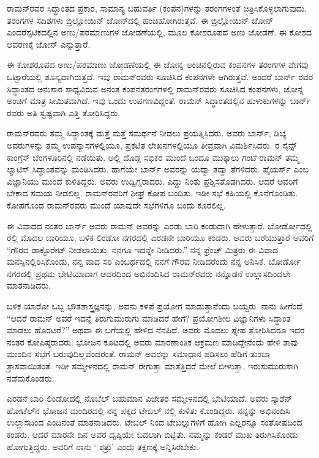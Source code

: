 ರಾಮನ್‍ರವರ ಸಿದ್ಧಾಂತದ ಪ್ರಕಾರ, ಸಾಮಾನ್ಯ ಬಹುವರ್ತಿ (ಕಂಪನ)ಗಳನ್ನು ತರಂಗ\-ಗಳಂತೆ ಚಿತ್ರಿಸಿಕೊಳ್ಳಲಾಗುವುದು. ತರಂಗಗಳ ಸದಿಶಗಳು ಬ್ರಿಲ್ಲೋಯಿನ್ ಜೋನ್‍ದಲ್ಲಿ ಹಂಚಿಹೋಗಿರುತ್ತವೆ. ಈ ಬ್ರಿಲ್ಲೋಯಿನ್ ಜೋನ್ ಎಂದರೆ\enginline{-}ಸ್ಫಟಿಕದಲ್ಲಿನ ಅಣು/ಪರಮಾಣುಗಳ ಜೋಡಣೆಯಲ್ಲಿ, ಮೂಲ ಕೋಶರೂಪದ ಅಣು ಜೋಡಣೆ. ಈ ಕೋಶದ ಆವರಣಕ್ಕೆ ಜೋನ್ ಎನ್ನುತ್ತಾರೆ.

ಈ ಕೋಶರೂಪದ ಅಣು/ಪರಮಾಣು ಜೋಡಣೆಯಲ್ಲಿ ಈ ಜೋನ್ನ ಅಂಚಿನಲ್ಲಿರುವ ಕಂಪನಗಳ ತರಂಗಗಳ ವೇಗವು ಒಟ್ಟಾರೆಯಲ್ಲಿ ಶೂನ್ಯವಾಗಿರುತ್ತದೆ. ಇವು ರಾಮನ್‍ರವರು ಸೂಚಿಸಿದ ಕಂಪನಗಳೇ ಆಗಿರುತ್ತವೆ. ಅಂದರೆ ಬಾರ್ನ್ ರವರ ಸಿದ್ಧಾಂತದ ಅನುಸಾರ ಸಾಧ್ಯವಿರುವ ಅನಂತ ಕಂಪನ\enginline{-}ತರಂಗಗಳಲ್ಲಿ ರಾಮನ್‍ರವರು ಸೂಚಿಸಿದ ಕಂಪನಗಳು, ಜೋನ್ನ ಅಂಚಿಗೆ ಮಾತ್ರ ಸೀಮಿತವಾಗಿದೆ. ಇವು ಒಂದು ಉಪಗಣವಿದ್ದಂತೆ. ರಾಮನ್ ಸಿದ್ಧಾಂತದಲ್ಲಿನ ಹುಳುಕುಗಳನ್ನು ಬಾರ್ನ್ ರವರು ಅತಿ ಸ್ವಷ್ಟವಾಗಿ ಎತ್ತಿ ತೋರಿಸಿದ್ದರು.

ರಾಮನ್‍ರವರು ತಮ್ಮ ಸಿದ್ಧಾಂತಕ್ಕೆ ಮತ್ತೆ ಮತ್ತೆ ಸಮರ್ಥನೆ ನೀಡಲು ಪ್ರಯತ್ನಿಸಿದರು. ಅವರು ಬಾರ್ನ್, ಡಿಬ್ಯೆ ಅವರುಗಳನ್ನು ತಮ್ಮ ಉಪನ್ಯಾಸಗಳಲ್ಲಿಯೂ, ಪ್ರಕಟಿತ ಲೇಖನಗಳಲ್ಲಿಯೂ ತೀವ್ರವಾಗಿ ವಿಮರ್ಶಿಸಿದರು. ರ ಸೈನ್ಸ್ ಕಾಂಗ್ರೆಸ್ ಬೆಂಗಳೂರಿನಲ್ಲಿ ನಡೆಯಿತು. ಅಲ್ಲಿ ದೊಡ್ಡ ಸಭಿಕರ ಮುಂದೆ ಒಂದೂ ಮುಕ್ಕಾಲು ಗಂಟೆ ರಾಮನ್ ತಮ್ಮ ಲ್ಯಾಟಿಸ್ ಸಿದ್ಧಾಂತವನ್ನು ಮಂಡಿಸಿದರು. ಹಾಗೆಯೇ ಬಾರ್ನ್ ಅವರನ್ನು ಯದ್ವಾ ತದ್ವಾ ತೆಗಳಿದರು. ಪೈಯರ್ಸ್ ಎಂಬ ವಿಜ್ಞಾನಿಯು ಮುಂದೆ ಕುಳಿತಿದ್ದರು. ಅವರು ಉದ್ವಿಗ್ನರಾದರು. ಎದ್ದು ನಿಂತು ಪ್ರಶ್ನಿಸತೊಡಗಿದರು. ಆದರೆ ಅವರಿಗೆ ಬೇಕಾದ ಸಮಯ ನೀಡಲಿಲ್ಲ. ರಾಮನ್‍ರವರಿಗೆ ಶೀಘ್ರ ಕೋಪ ಬಂದಿತು. ಇಡೀ ಸಭೆ ಕಹಿಯಲ್ಲಿ ಕೊನೆಗೊಂಡಿತು. ಕೋಪಗೊಂಡ ರಾಮನ್‍ರವರು ಮುಂದೆ ಯಾವುದೇ ಸಭೆಗಳಿಗೂ ಬಂದು ಕೂರಲಿಲ್ಲ.

ಈ ವಿವಾದದ ನಂತರ ಬಾರ್ನ್ ಅವರು ರಾಮನ್ ಅವರನ್ನು ಎರಡು ಬಾರಿ ಕಂಡುದಾಗಿ ಹೇಳುತ್ತಾರೆ. ಬೋರ್ಡೋದಲ್ಲಿ ರಲ್ಲಿ ಮೊದಲ ಬಾರಿಯೂ, ಬಳಿಕ ಲಿಂಡೋ ನಗರದಲ್ಲಿ ಎರಡನೇ ಬಾರಿಯೂ ಕಂಡರು. ಅವರು ಬರೆಯುತ್ತಾರೆ\enginline{-} ಅವರಿಗೆ “ಗೌರವ ಡಾಕ್ಟೊರೇಟ್ ನೀಡಲಾಯಿತು. ನನಗೂ ಇದನ್ನೇ ನೀಡಿದರು.” ನನ್ನ ಫ್ರೆಂಚ್ ಮಿತ್ರರು ಈ ವಿವಾದ ಮನಸ್ಸಿನಲ್ಲಿರಿಸಿಕೊಂಡು, ನನ್ನ ವಾದ ಸರಿ ಎಂಬರ್ಥದಲ್ಲಿ ನನಗೆ ಗೌರವ ನೀಡಿದರೆಂದು ನನ್ನ ಅನಿಸಿಕೆ. ಬೋರ್ಡೋ ನಗರದಲ್ಲಿ ಪ್ರಥಮ ಭೇಟಿಯಾದಾಗ ಆದರದಿಂದ ಅಭಿನಂದಿಸಿದ ರಾಮನ್‍ರವರು ನನ್ನೊಡನೆ ಉಲ್ಲಾಸದಿಂದಲೇ ಮಾತನಾಡಿದರು.

\newpage

ಬಳಿಕ ಯಾರೋ ಒಬ್ಬ ಭೌತಶಾಸ್ತ್ರಜ್ಞನನ್ನು, ಅವನು ಕಳಪೆ ಪ್ರಯೋಗ ಮಾಡುತ್ತಾನೆಂದು ಬಯ್ದರು. ನಾನು ಹೀಗೆಂದೆ \enginline{-} “ಆದರೆ ರಾಮನ್ ಅವರೆ ಇದನ್ನೆ ತಿರುಗುಮುರುಗು ಮಾಡಿದರೆ ಹೇಗೆ? ಪ್ರಯೋಗಶೀಲ ವಿಜ್ಞಾನಿಗಳು ಸಿದ್ಧಾಂತ ಮಾಡಲು ಹೊರಟರೆ?” ಅಥವಾ ಈ ಬಗೆಯಲ್ಲಿ ಹೇಳಿದ ನೆನಪಿದೆ. ಅವರು ಮೊದಲು ಸ್ನೇಹ ತೋರಿಸಿದರೂ ಇದರ ನಂತರ ಕೋಪಿಷ್ಠರಾದರು. ಭೋಜನ ಕೂಟದಲ್ಲಿ ಅವರು ಮಾರಣಾಂತಿಕ ಆಕ್ರಮಣ ಮಾಡಿದ್ದೇನೆಂದು ಹೇಳಿ ತಾವು ಮುಂದಿನ ಸಭೆಗೆ ಬರುವುದಿಲ್ಲವೆಂದರಂತೆ. ರಾಮನ್ ಅವರನ್ನು ಸಮಾಧಾನ ಪಡಿಸಲು ಹೆಡಿಗೆ ತುಂಬಾ ತ್ರಾಸವಾಯಿತಂತೆ. ಇಡೀ ಸಮ್ಮೇಳನದಲ್ಲಿ ರಾಮನ್ ರೇಗುತ್ತಾ ಮಾತೆತ್ತಿದರೆ ಮೇಲೆ ಬೀಳುತ್ತಾ, ಇರುಸುಮುರುಸಾಗಿ ನಡೆದುಕೊಂಡರು.

ಎರಡನೆ ಬಾರಿ ಲಿಂಡೋದಲ್ಲಿ ನೊಬೆಲ್ ಬಹುಮಾನ ವಿಜೇತರ ಸಮ್ಮೇಳನದಲ್ಲಿ ಭೇಟಿಯಾದೆ. ಅವರು ಸ್ಕಾಶೆನ್ ಹೋಟೆಲ್‍ನ ಭೋಜನ ಮಂದಿರದಲ್ಲಿ ನನ್ನ ಪಕ್ಕದ ಟೇಬಲ್ ನಲ್ಲಿ ಕುಳಿತು ಕೊಂಡಿದ್ದರು. ನನ್ನನ್ನು ಅಭಿನಂದಿಸಿ ಉಲ್ಲಾಸದಿಂದ ಎಂದಿನಂತೆ ಮಾತನಾಡಿದರು. ಟೇಬಲ್ ನಿಂದ ಟೇಬಲ್ಲುಗಳಿಗೆ ಹೋಗಿ ಎಲ್ಲರನ್ನೂ ಸಂತೋಷದಿಂದ ಕಂಡರು. ಆದರೆ ಮಾರನೇ ದಿನ ಅವರ ದೃಷ್ಠಿಯೇ ಬದಲಾಗಿ ಬಿಟ್ಟಿತು. ನಮ್ಮನ್ನು ಕಂಡರೆ ಮುಖ ತಿರುಗಿಸಿಕೊಂಡು ಹೋಗುತ್ತಿದ್ದರು. ಅವರಿಗೆ ನಾನು ‘ ಶತ್ರು’ ಎಂದು ತಕ್ಷಣಕ್ಕೆ ಅನ್ನಿಸಿರಬೇಕು.

